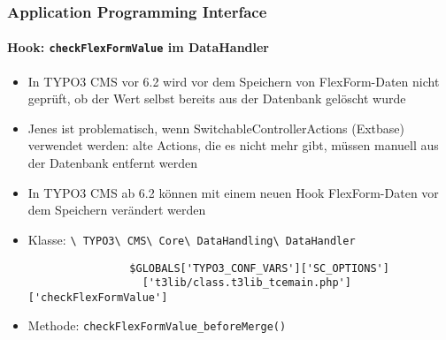 
\begin{frame}[fragile]
	\frametitle{Application Programming Interface}
	\framesubtitle{Hook: \texttt{checkFlexFormValue} im DataHandler}

	\begin{itemize}
		\item In TYPO3 CMS vor 6.2 wird vor dem Speichern von FlexForm-Daten nicht geprüft, ob der Wert selbst bereits aus der Datenbank gelöscht wurde
		\item Jenes ist problematisch, wenn SwitchableControllerActions (Extbase) verwendet werden: alte Actions, die es nicht mehr gibt, müssen manuell aus der Datenbank entfernt werden
		\item In TYPO3 CMS ab 6.2 können mit einem neuen Hook FlexForm-Daten vor dem Speichern verändert werden
		\item Klasse:\newline
			\smaller
				\texttt{\textbackslash
					TYPO3\textbackslash
					CMS\textbackslash
					Core\textbackslash
					DataHandling\textbackslash
					DataHandler}\normalsize

			\lstset{
				basicstyle=\smaller\ttfamily
			}

			\begin{lstlisting}
				$GLOBALS['TYPO3_CONF_VARS']['SC_OPTIONS']
				  ['t3lib/class.t3lib_tcemain.php']['checkFlexFormValue']
			\end{lstlisting}

		\item Methode:\newline
			\smaller
				\texttt{checkFlexFormValue\_beforeMerge()}

	\end{itemize}

\end{frame}


